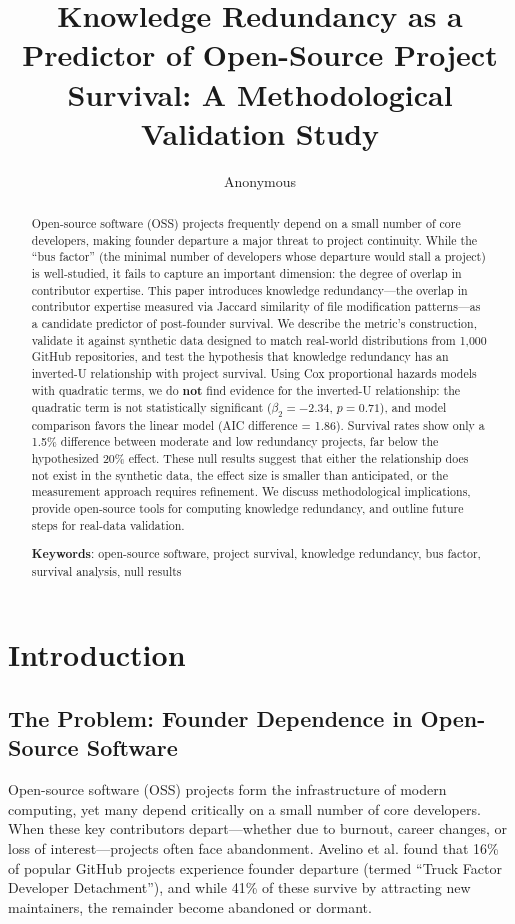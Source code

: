 \documentclass[11pt,letterpaper]{article}
\title{Knowledge Redundancy as a Predictor of Open-Source Project Survival: A Methodological Validation Study}
\author{Anonymous}
\date{}
\begin{document}
\maketitle

\begin{abstract}
Open-source software (OSS) projects frequently depend on a small number of core developers, making founder departure a major threat to project continuity. While the ``bus factor'' (the minimal number of developers whose departure would stall a project) is well-studied, it fails to capture an important dimension: the degree of overlap in contributor expertise. This paper introduces knowledge redundancy---the overlap in contributor expertise measured via Jaccard similarity of file modification patterns---as a candidate predictor of post-founder survival. We describe the metric's construction, validate it against synthetic data designed to match real-world distributions from 1,000 GitHub repositories, and test the hypothesis that knowledge redundancy has an inverted-U relationship with project survival. Using Cox proportional hazards models with quadratic terms, we do \textbf{not} find evidence for the inverted-U relationship: the quadratic term is not statistically significant ($\beta_2 = -2.34$, $p = 0.71$), and model comparison favors the linear model (AIC difference = 1.86). Survival rates show only a 1.5\% difference between moderate and low redundancy projects, far below the hypothesized 20\% effect. These null results suggest that either the relationship does not exist in the synthetic data, the effect size is smaller than anticipated, or the measurement approach requires refinement. We discuss methodological implications, provide open-source tools for computing knowledge redundancy, and outline future steps for real-data validation.

\textbf{Keywords}: open-source software, project survival, knowledge redundancy, bus factor, survival analysis, null results
\end{abstract}

\section{Introduction}

\subsection{The Problem: Founder Dependence in Open-Source Software}

Open-source software (OSS) projects form the infrastructure of modern computing, yet many depend critically on a small number of core developers. When these key contributors depart---whether due to burnout, career changes, or loss of interest---projects often face abandonment. Avelino et al. \cite{Avelino2019} found that 16\% of popular GitHub projects experience founder departure (termed ``Truck Factor Developer Detachment''), and while 41\% of these survive by attracting new maintainers, the remainder become abandoned or dormant.
\end{document}
